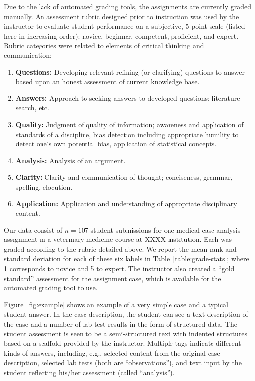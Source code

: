 Due to the lack of automated grading tools, the assignments are currently
graded manually. An assessment rubric designed prior to instruction was
used by the instructor to evaluate student performance on a subjective,
5-point scale (listed here in increasing order): novice, beginner,
competent, proficient, and expert. Rubric categories were related to
elements of critical thinking and communication:
\begin{enumerate}
\item {\bf Questions:} Developing relevant refining (or clarifying)
 questions to answer based upon an honest assessment of current knowledge
 base.
\item {\bf Answers:} Approach to seeking answers to developed
 questions; literature search, etc.
\item {\bf Quality:} Judgment of quality of information; awareness and
 application of standards of a discipline, bias detection including
 appropriate humility to detect one’s own potential bias, application of
 statistical concepts.
\item {\bf Analysis:} Analysis of an argument.
\item  {\bf Clarity:} Clarity and communication of thought; conciseness,
 grammar, spelling, elocution.
\item {\bf Application:} Application and understanding of appropriate
 disciplinary content.
\end{enumerate}




Our data consist of $n = 107$ student submissions for one medical case
analysis assignment in a veterinary medicine course at XXXX institution.
Each was graded according to the rubric detailed above.  We report the mean
rank and standard deviation for each of these six labels in
Table~\ref{table:grade-stats}; where 1 corresponds to novice and 5 to
expert. The instructor also created a ``gold standard'' assessment for the
assignment case, which is available for the automated grading tool to use.

Figure~\ref{fig:example} shows an example of a very simple case and a typical
student answer. In the case description, the student can see a text
description of the case and a number of lab test results in the form of
structured data. The student assessment is seen to be a semi-structured
text with indented structures based on a scaffold provided by the
instructor. Multiple tags indicate different kinds of answers, including,
e.g., selected content from the original case description, selected lab
tests (both are ``observations''), and text input by the student reflecting
his/her assessment (called ``analysis'').

